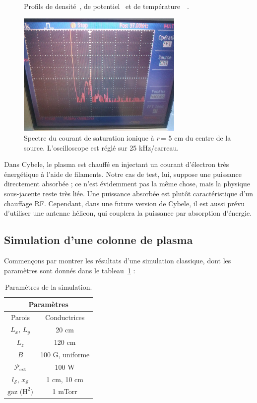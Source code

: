 \begin{refsection}
\begin{figure}[!htbp]
    \caption{Profils de densité~, de
    potentiel~ et de
    température~~\parencite{SimoninHDR}.}
    \label{4-CybeleExp}
\end{figure}
\begin{figure}[!htbp]
  \centering
    \includegraphics[height=6cm]{figures/4-CybeleFourierSignal.jpg}
    \caption{Spectre du courant de saturation
    ionique à $r\,$= 5 cm du centre de la source.
    L'oscilloscope est réglé sur 25 kHz/carreau.\label{4-CybeleFourierSignal}}
\end{figure}

Dans Cybele, le plasma est chauffé en injectant un courant
d'électron très énergétique à l'aide de filaments. Notre cas de
test, lui, suppose une puissance directement absorbée ; ce n'est évidemment pas
la même chose, mais la physique sous-jacente reste très liée. Une puissance
absorbée est plutôt caractéristique d'un chauffage RF. Cependant, dans une future version de Cybele, il est aussi
prévu d'utiliser une antenne hélicon, qui couplera la puissance par absorption d'énergie.
 
\subsection{Simulation d'une colonne de plasma}

Commençons par montrer les résultats d'une simulation classique, dont les
paramètres sont donnés dans le tableau~\ref{4-CybeleParam1} :

\begin{table}[!htbp]
\footnotesize\centering
{}
\begin{tabular}{cc}\toprule
\multicolumn{2}{c}{\bf Paramètres}\\
\midrule 
Parois & Conductrices\\
$L_x$, $L_y$ & 20 cm\\
$L_z$ & 120 cm\\
$B$&100 G, uniforme\\
$\mathcal{P}_\text{ext}$&100 W\\
$l_\mathcal{S}$, $x_\mathcal{S}$& 1 cm, 10 cm\\
$\text{gaz (H}^2\text{)}$ & 1 mTorr\\
\bottomrule
\end{tabular}
\caption{Paramètres de la simulation.}\label{4-CybeleParam1}
\end{table}


\end{refsection}
